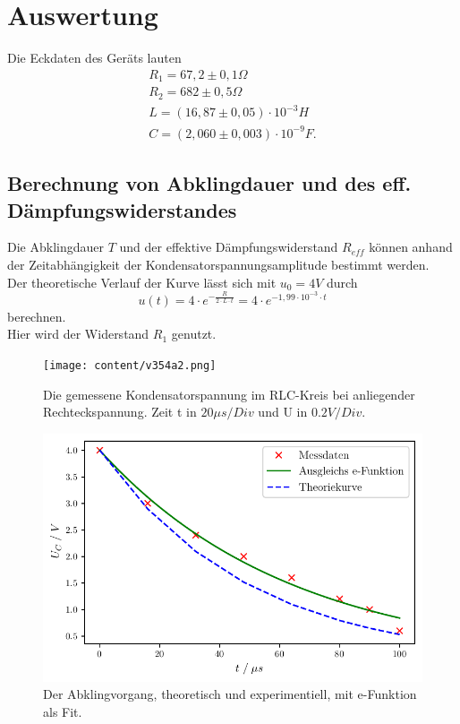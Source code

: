 \section{Auswertung}
\label{sec:Auswertung}

Die Eckdaten des Geräts lauten 
\begin{align}
  R_1 = 67,2 \pm 0,1 \Omega \\
  R_2 = 682 \pm 0,5 \Omega \\
  L = (16,87 \pm 0,05) \cdot 10^{-3}H \\
  C = (2,060 \pm 0,003) \cdot 10^{-9}F.   %
\end{align}






\subsection{Berechnung von Abklingdauer und des eff. Dämpfungswiderstandes}
\label{Abklingdauer und R_daempf}

Die Abklingdauer $T$ und der effektive Dämpfungswiderstand $R_{eff}$ können anhand der Zeitabhängigkeit der Kondensatorspannungsamplitude 
bestimmt werden.\\

Der theoretische Verlauf der Kurve lässt sich mit $u_0 = 4V$ durch 
\begin{equation*}
    u(t) = 4 \cdot e^{-\frac{R}{2 \cdot L \cdot t}} = 4 \cdot e^{- 1,99 \cdot 10^{-3} \cdot t}
\end{equation*}
berechnen.\\
Hier wird der Widerstand $R_1$ genutzt. 

\begin{figure}[H]
  \centering
  \texttt{[image: content/v354a2.png]}
  \caption{Die gemessene Kondensatorspannung im RLC-Kreis bei anliegender Rechteckspannung. Zeit t in $20\mu s/Div$ und U in $0.2V/Div$.}
  \label{fig:MessApp}
\end{figure}



\begin{figure}
  \centering
  \includegraphics{build/plot_Tex.pdf}
  \caption{Der Abklingvorgang, theoretisch und experimentiell, mit e-Funktion als Fit.}
  \label{fig:plot_abklingdauer}
\end{figure}

